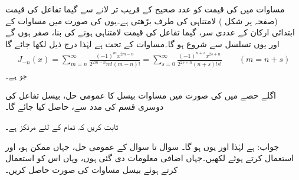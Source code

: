 مساوات  میں  کی قیمت کو عدد صحیح کے قریب تر لانے سے گیما تفاعل کی قیمت (صفحہ  پر شکل ) لامتناہی کی طرف بڑھتی ہے۔یوں  کی صورت میں مساوات  کے ابتدائی  ارکان کے عددی سر، گیما تفاعل کی قیمت لامتناہی ہونے کی بنا، صفر ہوں گے اور یوں تسلسل  سے شروع ہو گا۔مساوات  کے تحت  ہے لہٰذا درج ذیل لکھا جائے گا
\begin{align*}
J_{-n}(x)=\sum_{m=n}^{\infty}\frac{(-1)^mx^{2m-n}}{2^{2m-n}m!(m-n)!}=\sum_{s=0}^{\infty}\frac{(-1)^{n+s}x^{2s+n}}{2^{2s+n} (n+s)!s!}\quad \quad (m=n+s)
\end{align*}
جو  ہے۔

اگلے حصے میں  کی صورت میں مساوات بیسل کا عمومی حل، بیسل تفاعل کی دوسری قسم  کی مدد سے، حاصل کیا جائے گا۔


ثابت کریں کہ  تمام  کے لئے مرتکز ہے۔

جواب:  ہے لہٰذا 
 اور یوں  ہو گا۔
سوال  تا سوال  کے عمومی حل، جہاں ممکن ہو،   اور  استعمال کرتے ہوئے لکھیں۔جہاں اضافی معلومات دی گئی ہوں، وہاں اس کو استعمال کرتے ہوئے بیسل مساوات کی صورت حاصل کریں۔

